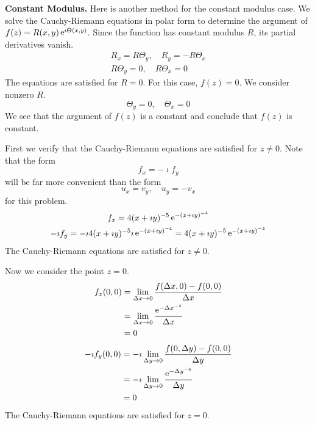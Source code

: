 {\begin{Solution}
  \textbf{Constant Modulus.}
  Here is another method for the constant modulus case.
  We solve the Cauchy-Riemann equations in polar form to determine the 
  argument of $f(z) = R(x,y) \mathop{\mathrm{e}}\nolimits^{\imath \Theta(x,y)}$.  Since the function has constant
  modulus $R$, its partial derivatives vanish.
  \begin{gather*}
    R_x = R \Theta_y, \quad R_y = - R \Theta_x
    \\
    R \Theta_y = 0, \quad R \Theta_x = 0
  \end{gather*}
  The equations are satisfied for $R = 0$.  For this case, $f(z) = 0$. 
  We consider nonzero $R$.
  \[
  \Theta_y = 0, \quad \Theta_x = 0
  \]
  We see that the argument of $f(z)$ is a constant and conclude 
  that $f(z)$ is constant.
\end{Solution}






\begin{Solution}
  \label{solution e-z-4}
  First we verify that the Cauchy-Riemann equations are satisfied for 
  $z \neq 0$.  Note that the form
  \[
  f_x = - \imath f_y
  \]
  will be far more convenient than the form
  \[
  u_x = v_y, \quad u_y = - v_x
  \]
  for this problem.
  \begin{gather*}
    f_x = 4 (x + \imath y)^{-5} \mathop{\mathrm{e}}\nolimits^{-(x + \imath y)^{-4}} 
    \\
    -\imath f_y = -\imath 4 (x + \imath y)^{-5} \imath  \mathop{\mathrm{e}}\nolimits^{-(x + \imath y)^{-4}} 
    = 4 (x + \imath y)^{-5} \mathop{\mathrm{e}}\nolimits^{-(x + \imath y)^{-4}}
  \end{gather*}
  The Cauchy-Riemann equations are satisfied for $z \neq 0$.

  Now we consider the point $z = 0$.
  \begin{align*}
    f_x(0,0) &= \lim_{\Delta x \to 0} \frac{f(\Delta x, 0) - f(0,0)}{ \Delta x } 
    \\
    &= \lim_{\Delta x \to 0} \frac{\mathop{\mathrm{e}}\nolimits^{-\Delta x^{-4}} }{ \Delta x } 
    \\
    &= 0
  \end{align*}
  \begin{align*}
    -\imath f_y(0,0) &= -\imath \lim_{\Delta y \to 0} \frac{f(0, \Delta y) - f(0,0)}{ \Delta y } 
    \\
    &= -\imath \lim_{\Delta y \to 0} \frac{\mathop{\mathrm{e}}\nolimits^{-\Delta y^{-4}} }{ \Delta y } 
    \\
    &= 0
  \end{align*}
  The Cauchy-Riemann equations are satisfied for $z = 0$.




\end{Solution}}
